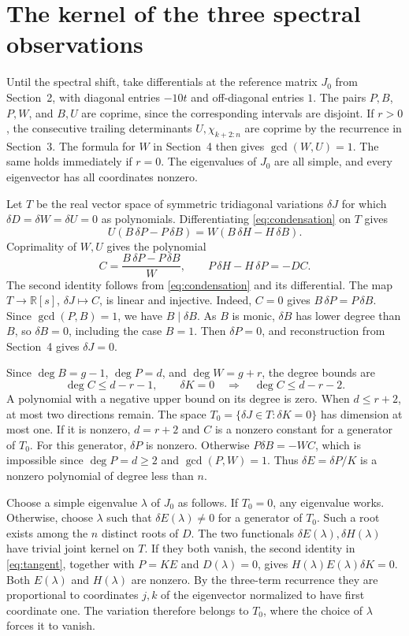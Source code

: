 \documentclass[11pt,a4paper]{article}
\newcommand{\sect}[1]{\section{#1}}
\begin{document}
\sect{The kernel of the three spectral observations}
Until the spectral shift, take differentials at the reference matrix \(J_0\) from Section~2, with diagonal entries \(-10t\) and off-diagonal entries \(1\). The pairs \(P,B\), \(P,W\), and \(B,U\) are coprime, since the corresponding intervals are disjoint. If \(r>0\), the consecutive trailing determinants \(U,\chi_{k+2:n}\) are coprime by the recurrence in Section~3. The formula for \(W\) in Section~4 then gives \(\gcd(W,U)=1\). The same holds immediately if \(r=0\). The eigenvalues of \(J_0\) are all simple, and every eigenvector has all coordinates nonzero.

Let \(T\) be the real vector space of symmetric tridiagonal variations \(\delta J\) for which \(\delta D=\delta W=\delta U=0\) as polynomials. Differentiating \eqref{eq:condensation} on \(T\) gives
\[
 U(B\,\delta P-P\,\delta B)= W(B\,\delta H-H\,\delta B).
\]
Coprimality of \(W,U\) gives the polynomial
\begin{equation}
 C=\frac{B\,\delta P-P\,\delta B}{W},\qquad
 P\,\delta H-H\,\delta P=-D C .                         \label{eq:tangent}
\end{equation}
The second identity follows from \eqref{eq:condensation} and its differential. The map \(T\to\mathbb R[s]\), \(\delta J\mapsto C\), is linear and injective. Indeed, \(C=0\) gives \(B\,\delta P=P\,\delta B\). Since \(\gcd(P,B)=1\), we have \(B\mid\delta B\). As \(B\) is monic, \(\delta B\) has lower degree than \(B\), so \(\delta B=0\), including the case \(B=1\). Then \(\delta P=0\), and reconstruction from Section~4 gives \(\delta J=0\).

Since \(\deg B=g-1\), \(\deg P=d\), and \(\deg W=g+r\), the degree bounds are
\[
        \deg C\le d-r-1,\qquad
        \delta K=0\quad\Longrightarrow\quad\deg C\le d-r-2 .
\]
A polynomial with a negative upper bound on its degree is zero. When \(d\le r+2\), at most two directions remain. The space \(T_0=\{\delta J\in T:\delta K=0\}\) has dimension at most one. If it is nonzero, \(d=r+2\) and \(C\) is a nonzero constant for a generator of \(T_0\). For this generator, \(\delta P\) is nonzero. Otherwise \(P\delta B=-WC\), which is impossible since \(\deg P=d\ge2\) and \(\gcd(P,W)=1\). Thus \(\delta E=\delta P/K\) is a nonzero polynomial of degree less than \(n\).

Choose a simple eigenvalue \(\lambda\) of \(J_0\) as follows. If \(T_0=0\), any eigenvalue works. Otherwise, choose \(\lambda\) such that \(\delta E(\lambda)\ne0\) for a generator of \(T_0\). Such a root exists among the \(n\) distinct roots of \(D\). The two functionals \(\delta E(\lambda),\delta H(\lambda)\) have trivial joint kernel on \(T\). If they both vanish, the second identity in \eqref{eq:tangent}, together with \(P=KE\) and \(D(\lambda)=0\), gives \(H(\lambda)E(\lambda)\delta K=0\). Both \(E(\lambda)\) and \(H(\lambda)\) are nonzero. By the three-term recurrence they are proportional to coordinates \(j,k\) of the eigenvector normalized to have first coordinate one. The variation therefore belongs to \(T_0\), where the choice of \(\lambda\) forces it to vanish.
\end{document}
